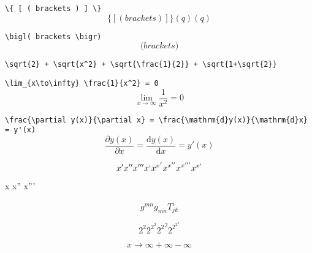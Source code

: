 \documentclass{article}
\begin{document}
\verb|\{ [ ( brackets ) ] \}|
\[ \{ [ ( brackets ) ] \} (q) \left( q \right) \]

\verb|\bigl( brackets \bigr)|
\[ \bigl( brackets \bigr) \]

\verb|\sqrt{2} + \sqrt{x^2} + \sqrt{\frac{1}{2}} + \sqrt{1+\sqrt{2}}|

\verb|\lim_{x\to\infty} \frac{1}{x^2} = 0|
\[ \lim_{x\to\infty} \frac{1}{x^2} = 0 \]

\verb|\frac{\partial y(x)}{\partial x} = \frac{\mathrm{d}y(x)}{\mathrm{d}x} = y'(x)|
\[ \frac{\partial y(x)}{\partial x} = \frac{\mathrm{d}y(x)}{\mathrm{d}x} = y'(x) \]

\[ x' x'' x''' x` x^{x'} x^{x''} x^{x'''} x^{x`}\]

{\firatext x x'' x'''}


\[ g^{mn} g_{mn} T^{i}_{jk} \]

\[ 2^2 2^{2^2} {2^2}^2 2^{2^{2^2}} \]

\[ x \to \infty + \infty - \infty \]
\end{document}
